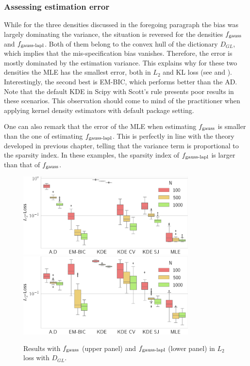 \subsubsection{Assessing estimation error}

While for the three densities discussed in the foregoing paragraph the bias was largely dominating 
the variance, the situation is reversed for the densities $f_{\textnormal{gauss}}$ and 
$f_{\textnormal{gauss-lapl}}$. Both of them belong to the convex hull of the dictionary 
$D_{GL}$, which implies that the mis-specification bias vanishes. Therefore, the error
is mostly dominated by the estimation variance. This explains why for these two densities
the MLE has the smallest error, both in $L_2$ and KL loss (see  
and ). Interestingly, the second best is EM-BIC, which performs 
better than the AD. Note that the default KDE in Scipy \citep{scipy} with Scott's rule 
presents poor results in these scenarios. This observation should come to mind of the 
practitioner when applying kernel density estimators with default package setting. 

One can also remark that the error of the MLE when estimating $f_{\textnormal{gauss}}$
is smaller than the one of estimating $f_{\textnormal{gauss-lapl}}$. This is perfectly
in line with the theory developed in previous chapter, telling that the variance term
is proportional to the sparsity index. In these examples, the sparsity index of 
$f_{\textnormal{gauss-lapl}}$ is larger than that of $f_{\textnormal{gauss}}$.

\begin{figure}
\center
    \includegraphics[width=0.8\textwidth]{./TeX_files/res_gauss_L2_GL.png}
    \includegraphics[width=0.8\textwidth]{./TeX_files/res_lapl_gauss_L2_GL.png}
    \caption{Results with $f_{\textnormal{gauss}}$ (upper panel) and $f_{\textnormal{gauss-lapl}}$ 
    (lower panel) in $L_2$ loss with $D_{GL}$.}
    \label{fig:res_lapl_gauss_L2_GL}
\end{figure}

